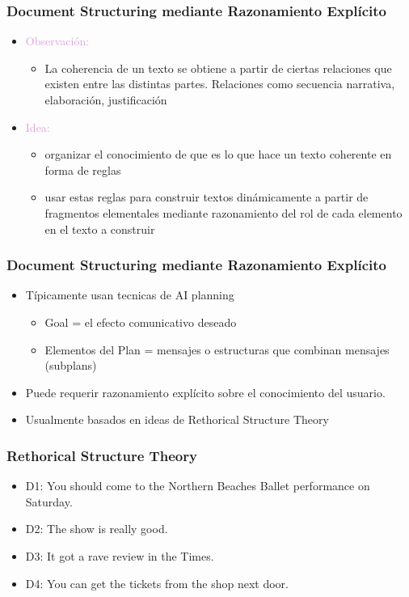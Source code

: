 \documentclass[compress,color=usenames]{beamer}
\newcommand{\mH}[1]{\textcolor{Plum}{#1}}
\begin{document}
\begin{frame}
\frametitle{Document Structuring mediante Razonamiento Expl\'icito}

\label{f150}
\begin{itemize}
\item { \mH{Observaci\'on:}}
\begin{itemize}
\item La coherencia de un texto se obtiene a partir de ciertas relaciones que existen 
entre las distintas partes. Relaciones como secuencia narrativa, elaboraci\'on, justificaci\'on
\end{itemize}
\item { \mH{Idea:}}
\begin{itemize}
\item organizar el conocimiento de que es lo que hace un texto coherente en forma de reglas
\item usar estas reglas para construir textos din\'amicamente a partir de fragmentos elementales 
mediante razonamiento del rol de cada elemento en el texto a construir
\end{itemize}
\end{itemize}
 \end{frame}

\begin{frame}
\frametitle{Document Structuring mediante Razonamiento Expl\'icito}

\label{f152}
\begin{itemize}
\item T\'ipicamente usan tecnicas de AI planning
\begin{itemize}
\item Goal = el efecto comunicativo deseado
\item Elementos del Plan = mensajes o estructuras que combinan mensajes  (subplans)
\end{itemize}
\item Puede requerir razonamiento expl\'icito sobre el conocimiento del usuario.
\item Usualmente basados en ideas de Rethorical Structure Theory
\end{itemize}
 
\end{frame}

\begin{frame}
\frametitle{Rethorical Structure Theory}
\begin{itemize}
	
\item D1: You should come to the Northern Beaches Ballet performance on Saturday.
\item D2: The show is really good.
\item D3: It got a rave review in the Times. 
\item D4: You can get the tickets from the shop next door.
\end{itemize}
\end{frame}
\end{document}

